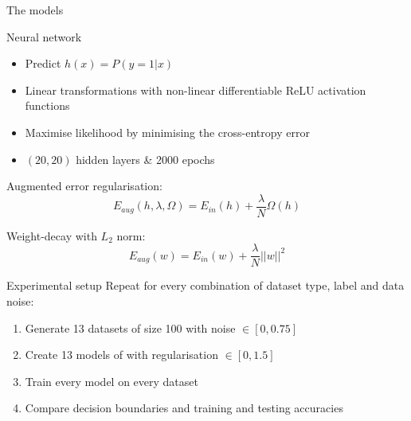 \documentclass[9.5pt]{beamer}
\begin{document}
    \begin{frame}{The models}
        \begin{block}{Neural network}
            \small
            \begin{itemize}
                \item Predict $h(x) = P(y = 1 | x)$
                \item Linear transformations with non-linear differentiable ReLU activation functions
                \item Maximise likelihood by minimising the cross-entropy error
                \item $(20, 20)$ hidden layers \& 2000 epochs
            \end{itemize}
        \end{block}

        Augmented error regularisation:
        \[E_{aug}(h, \lambda, \Omega) = E_{in}(h) + \dfrac{\lambda}{N}\Omega(h)\]

        Weight-decay with $L_2$ norm:
        \[E_{aug}(w) = E_{in}(w) + \dfrac{\lambda}{N} ||w||^2\]
    \end{frame}

    \begin{frame}{Experimental setup}
        Repeat for every combination of dataset type, label and data noise:
        \begin{enumerate}
            \item Generate 13 datasets of size 100 with noise $\in [0, 0.75]$
            \item Create 13 models of with regularisation $\in [0, 1.5]$
            \item Train every model on every dataset
            \item Compare decision boundaries and training and testing accuracies
        \end{enumerate}
    \end{frame}
\end{document}

